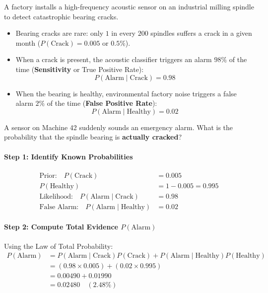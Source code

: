 \begin{example}
A factory installs a high-frequency acoustic sensor on an industrial milling spindle to detect catastrophic bearing cracks.
\begin{itemize}
    \item Bearing cracks are rare: only $1$ in every $200$ spindles suffers a crack in a given month ($P(\text{Crack}) = 0.005$ or $0.5\%$).
    \item When a crack is present, the acoustic classifier triggers an alarm $98\%$ of the time (\textbf{Sensitivity} or True Positive Rate):
    \begin{equation*}
    P(\text{Alarm} \mid \text{Crack}) = 0.98
    \end{equation*}
    \item When the bearing is healthy, environmental factory noise triggers a false alarm $2\%$ of the time (\textbf{False Positive Rate}):
    \begin{equation*}
    P(\text{Alarm} \mid \text{Healthy}) = 0.02
    \end{equation*}
\end{itemize}
A sensor on Machine 42 suddenly sounds an emergency alarm. What is the probability that the spindle bearing is \textbf{actually cracked}?

\paragraph{Step 1: Identify Known Probabilities}
\begin{align*}
\text{Prior:}\quad P(\text{Crack}) &= 0.005 \\
P(\text{Healthy}) &= 1 - 0.005 = 0.995 \\
\text{Likelihood:}\quad P(\text{Alarm} \mid \text{Crack}) &= 0.98 \\
\text{False Alarm:}\quad P(\text{Alarm} \mid \text{Healthy}) &= 0.02
\end{align*}

\paragraph{Step 2: Compute Total Evidence $P(\text{Alarm})$}
Using the Law of Total Probability:
\begin{align*}
P(\text{Alarm}) &= P(\text{Alarm} \mid \text{Crack})P(\text{Crack}) + P(\text{Alarm} \mid \text{Healthy})P(\text{Healthy}) \\
&= (0.98 \times 0.005) + (0.02 \times 0.995) \\
&= 0.00490 + 0.01990 \\
&= \mathbf{0.02480} \quad (2.48\%)
\end{align*}


\end{example}
